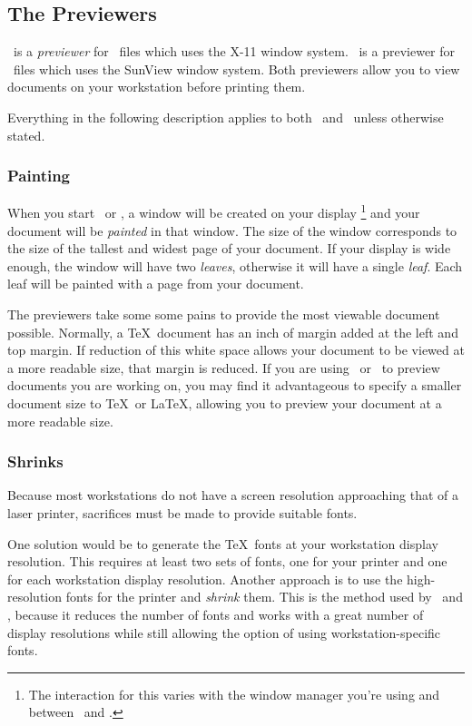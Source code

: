 \subsection{The Previewers}
\texx\ is a {\em previewer} for \dvi\ files which uses the X-11 window system.
\texsun\ is a previewer for \dvi\ files which uses the SunView window system.
Both previewers allow you to
view documents on your workstation before printing them.

Everything in the following
description applies to both \texx\ and \texsun\ unless
otherwise stated.

\subsubsection{Painting}
When you start \texx\ or \texsun , a window will be created on your display
\footnote{
	The interaction for this varies with the window manager you're using
	and between \texx\ and \texsun.
}
and your document will be {\em painted} in that window.
The size of the window corresponds to the size of the tallest and widest
page of your document.
If your display is wide enough, the window will have two {\em leaves},
otherwise it will have a single {\em leaf}.
Each leaf will be painted with a page from your document.

The previewers take some 
some pains to provide the most viewable document possible.
Normally, a \TeX\ document has an inch of margin added at the left and
top margin.
If reduction of this white space allows your document to be viewed
at a more readable size, that margin is reduced.
If you are using \texx\ or \texsun\ to preview documents you are working
on, you may find it advantageous to specify a smaller document size
to \TeX\ or \LaTeX, allowing you to preview your document at a more
readable size.

\subsubsection{Shrinks}
Because most workstations do not have a screen resolution approaching that
of a laser printer,
sacrifices must be made to provide suitable fonts.

One solution would be to generate the \TeX\ fonts at your workstation
display resolution.
This requires at least two sets of fonts, one for your printer and one
for each workstation display resolution.
Another approach is to use the high-resolution fonts for the printer
and {\em shrink} them.
This is the method used by \texx\ and \texsun,
because it reduces the number of fonts
and works with a great number of display resolutions
while still allowing the option of using workstation-specific fonts.

